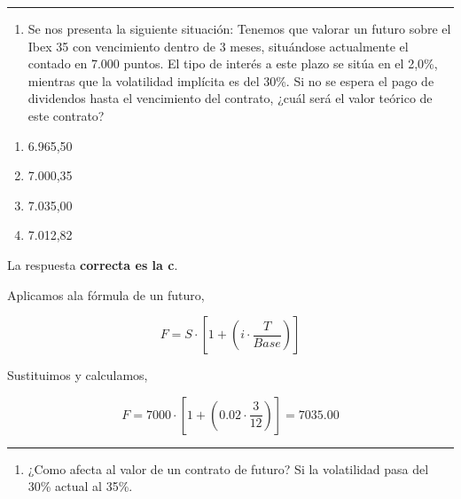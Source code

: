 \documentclass[
  letterpaper,
  DIV=11,
  numbers=noendperiod]{scrreprt}
\providecommand{\tightlist}{%
  \setlength{\itemsep}{0pt}\setlength{\parskip}{0pt}}\usepackage{longtable,booktabs,array}
\begin{document}
\begin{center}\rule{0.5\linewidth}{0.5pt}\end{center}

\begin{enumerate}
\def\labelenumi{\arabic{enumi}.}
\setcounter{enumi}{15}
\tightlist
\item
  Se nos presenta la siguiente situación: Tenemos que valorar un futuro
  sobre el Ibex 35 con vencimiento dentro de 3 meses, situándose
  actualmente el contado en 7.000 puntos. El tipo de interés a este
  plazo se sitúa en el 2,0\%, mientras que la volatilidad implícita es
  del 30\%. Si no se espera el pago de dividendos hasta el vencimiento
  del contrato, ¿cuál será el valor teórico de este contrato?
\end{enumerate}

\begin{enumerate}
\def\labelenumi{\alph{enumi})}
\item
  6.965,50
\item
  7.000,35
\item
  7.035,00
\item
  7.012,82
\end{enumerate}

\begin{tcolorbox}[enhanced jigsaw, left=2mm, opacityback=0, colback=white, breakable, arc=.35mm, bottomrule=.15mm, rightrule=.15mm, toprule=.15mm, leftrule=.75mm, colframe=quarto-callout-tip-color-frame]
\begin{minipage}[t]{5.5mm}
\textcolor{quarto-callout-tip-color}{\faLightbulb}
\end{minipage}%
\begin{minipage}[t]{\textwidth - 5.5mm}

La respuesta \textbf{correcta es la c}.

Aplicamos ala fórmula de un futuro,

\[F=S\cdot\left[1+(i\cdot\frac{T}{Base})\right]\]

Sustituimos y calculamos,

\[F=7000\cdot\left[1+(0.02\cdot\frac{3}{12})\right]=7035.00\]

\end{minipage}%
\end{tcolorbox}

\begin{center}\rule{0.5\linewidth}{0.5pt}\end{center}

\begin{enumerate}
\def\labelenumi{\arabic{enumi}.}
\setcounter{enumi}{16}
\tightlist
\item
  ¿Como afecta al valor de un contrato de futuro? Si la volatilidad pasa
  del 30\% actual al 35\%.
\end{enumerate}
\end{document}
